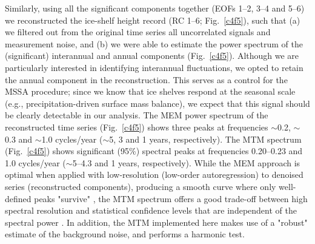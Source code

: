 Similarly, using all the significant components together (EOFs 1--2, 3--4 and 5--6) we reconstructed the ice-shelf height record (RC 1--6; Fig.~\ref{c4f5}), such that (a) we filtered out from the original time series all uncorrelated signals and measurement noise, and (b) we were able to estimate the power spectrum of the (significant) interannual and annual components (Fig.~\ref{c4f5}). Although we are particularly interested in identifying interannual fluctuations, we opted to retain the annual component in the reconstruction. This serves as a control for the MSSA procedure; since we know that ice shelves respond at the seasonal scale (e.g., precipitation-driven surface mass balance), we expect that this signal should be clearly detectable in our analysis. The MEM power spectrum of the reconstructed time series (Fig.~\ref{c4f5}) shows three peaks at frequencies $\sim$0.2, $\sim$0.3 and $\sim$1.0 cycles/year ($\sim$5, 3 and 1 years, respectively). The MTM spectrum (Fig.~\ref{c4f5}) shows significant (95\%) spectral peaks at frequencies 0.20--0.23 and 1.0 cycles/year ($\sim$5--4.3 and 1 years, respectively). While the MEM approach is optimal when applied with low-resolution (low-order autoregression) to denoised series (reconstructed components), producing a smooth curve where only well-defined peaks "survive" \parencite{Penland1991}, the MTM spectrum offers a good trade-off between high spectral resolution and statistical confidence levels that are independent of the spectral power \parencite{Mann1996, Percival1993}. In addition, the MTM implemented here \parencite{Mann1996} makes use of a "robust" estimate of the background noise, and performs a harmonic test.


